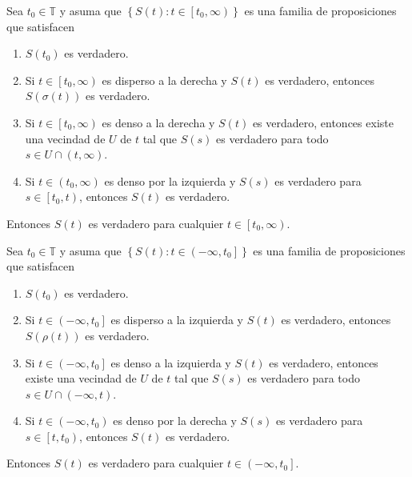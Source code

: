 \begin{frame}
\begin{theorem}
Sea $t_{0}\in\mathds{T}$ y asuma que $\left\{S\left(t\right):t\in\left[t_{0},\infty\right)\right\}$ es una familia de proposiciones que satisfacen
	\begin{enumerate}
		\item $S\left(t_{0}\right)$ es verdadero.
		\item Si $t\in\left[t_{0},\infty\right)$ es disperso a la derecha y $S\left(t\right)$ es verdadero, entonces $S\left(\sigma\left(t\right)\right)$ es verdadero.
		\item Si $t\in\left[t_{0},\infty\right)$ es denso a la derecha y $S\left(t\right)$ es verdadero, entonces existe una vecindad de $U$ de $t$ tal que $S\left(s\right)$ es verdadero para todo $s\in U\cap\left(t,\infty\right)$.
		\item Si $t\in\left(t_{0},\infty\right)$ es denso por la izquierda y $S\left(s\right)$ es verdadero para $s\in\left[t_{0},t\right)$, entonces $S\left(t\right)$ es verdadero.
	\end{enumerate}
Entonces $S\left(t\right)$ es verdadero para cualquier $t\in\left[t_{0},\infty\right)$.
\end{theorem}

\begin{theorem}
Sea $t_{0}\in\mathds{T}$ y asuma que $\left\{S\left(t\right):t\in\left(-\infty,t_{0}\right]\right\}$ es una familia de proposiciones que satisfacen
	\begin{enumerate}
		\item $S\left(t_{0}\right)$ es verdadero.
		\item Si $t\in\left(-\infty,t_{0}\right]$ es disperso a la izquierda y $S\left(t\right)$ es verdadero, entonces $S\left(\rho\left(t\right)\right)$ es verdadero.
		\item Si $t\in\left(-\infty,t_{0}\right]$ es denso a la izquierda y $S\left(t\right)$ es verdadero, entonces existe una vecindad de $U$ de $t$ tal que $S\left(s\right)$ es verdadero para todo $s\in U\cap\left(-\infty,t\right)$.
		\item Si $t\in\left(-\infty,t_{0}\right)$ es denso por la derecha y $S\left(s\right)$ es verdadero para $s\in\left[t,t_{0}\right)$, entonces $S\left(t\right)$ es verdadero.
	\end{enumerate}
Entonces $S\left(t\right)$ es verdadero para cualquier $t\in\left(-\infty,t_{0}\right]$.
\end{theorem}
\end{frame}

